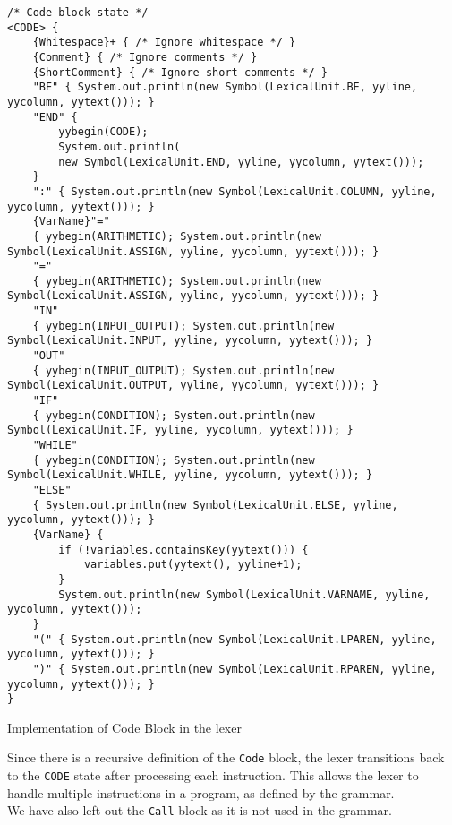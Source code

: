     \begin{verbatim}
/* Code block state */
<CODE> {
    {Whitespace}+ { /* Ignore whitespace */ }
    {Comment} { /* Ignore comments */ }
    {ShortComment} { /* Ignore short comments */ }
    "BE" { System.out.println(new Symbol(LexicalUnit.BE, yyline, yycolumn, yytext())); }
    "END" {
        yybegin(CODE);
        System.out.println(
        new Symbol(LexicalUnit.END, yyline, yycolumn, yytext()));
    }
    ":" { System.out.println(new Symbol(LexicalUnit.COLUMN, yyline, yycolumn, yytext())); }
    {VarName}"=" 
    { yybegin(ARITHMETIC); System.out.println(new Symbol(LexicalUnit.ASSIGN, yyline, yycolumn, yytext())); }
    "=" 
    { yybegin(ARITHMETIC); System.out.println(new Symbol(LexicalUnit.ASSIGN, yyline, yycolumn, yytext())); }
    "IN"
    { yybegin(INPUT_OUTPUT); System.out.println(new Symbol(LexicalUnit.INPUT, yyline, yycolumn, yytext())); }
    "OUT"
    { yybegin(INPUT_OUTPUT); System.out.println(new Symbol(LexicalUnit.OUTPUT, yyline, yycolumn, yytext())); }
    "IF"
    { yybegin(CONDITION); System.out.println(new Symbol(LexicalUnit.IF, yyline, yycolumn, yytext())); }
    "WHILE"
    { yybegin(CONDITION); System.out.println(new Symbol(LexicalUnit.WHILE, yyline, yycolumn, yytext())); }
    "ELSE"
    { System.out.println(new Symbol(LexicalUnit.ELSE, yyline, yycolumn, yytext())); }
    {VarName} {
        if (!variables.containsKey(yytext())) {
            variables.put(yytext(), yyline+1);
        }
        System.out.println(new Symbol(LexicalUnit.VARNAME, yyline, yycolumn, yytext()));
    }
    "(" { System.out.println(new Symbol(LexicalUnit.LPAREN, yyline, yycolumn, yytext())); }
    ")" { System.out.println(new Symbol(LexicalUnit.RPAREN, yyline, yycolumn, yytext())); }
}
\end{verbatim}

    \begin{table}[h]
		\centering
		\caption{Implementation of Code Block in the lexer}
	\end{table}

	Since there is a recursive definition of the \texttt{Code} block, the lexer transitions back to the \texttt{CODE} state after processing each instruction. This allows the lexer to handle multiple instructions in a program, as defined by the grammar.\\

	We have also left out the \texttt{Call} block as it is not used in the grammar.\\

